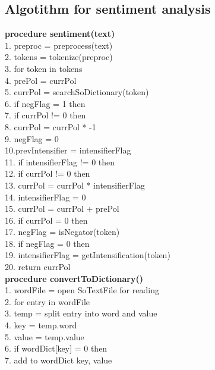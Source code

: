 \subsection{Algotithm for sentiment analysis}
\indent
\textbf{procedure sentiment(text)} \\
1. \indent preproc = preprocess(text) \\
2. \indent tokens = tokenize(preproc) \\
3. \indent for token in tokens  \\
4. \indent \indent prePol = currPol  \\
5. \indent \indent currPol = searchSoDictionary(token)  \\
6. \indent \indent if negFlag = 1 then \\
7. \indent \indent \indent if currPol != 0 then \\
8. \indent \indent \indent \indent currPol = currPol * -1 \\
9. \indent \indent \indent \indent negFlag = 0 \\
10.\indent \indent prevIntensifier = intensifierFlag \\
11. \indent \indent if intensifierFlag != 0 then \\
12. \indent \indent \indent if currPol != 0 then \\
13. \indent \indent \indent \indent currPol = currPol * intensifierFlag \\
14. \indent \indent \indent \indent intensifierFlag = 0 \\
15. \indent \indent currPol = currPol + prePol \\
16. \indent \indent if currPol = 0 then \\
17.	\indent \indent \indent negFlag = isNegator(token)  \\
18. \indent \indent \indent if negFlag = 0 then \\
19. \indent \indent \indent \indent intensifierFlag = getIntensification(token) \\
20. \indent return currPol \\

\indent
\textbf{procedure convertToDictionary()} \\
1. \indent wordFile = open SoTextFile for reading \\
2. \indent for entry in wordFile  \\
3. \indent \indent temp = split entry into word and value \\
4. \indent \indent key = temp.word \\
5. \indent \indent value = temp.value \\
6. \indent \indent if wordDict[key] = 0 then \\
7. \indent \indent \indent add to wordDict key, value \\

